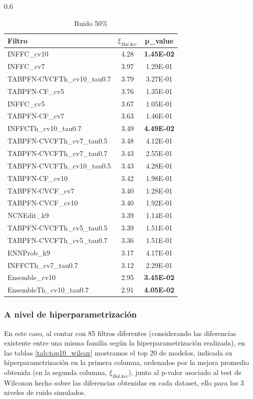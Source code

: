 \documentclass[print, color]{ugrTFG}
\begin{document}
\begin{table}[h!]
\begin{subtable}{0.6\textwidth}
\centering
\caption{Ruido 50\%}
\begin{tabular}{lcc}
\toprule
Filtro & $\xi_{BalAcc}$ & p\_value \\
\midrule
INFFC\_cv10 & 4.28 & \textbf{1.45E-02} \\
INFFC\_cv7 & 3.97 & 1.29E-01 \\
TABPFN-CVCFTh\_cv10\_tau0.7 & 3.79 & 3.27E-01 \\
TABPFN-CF\_cv5 & 3.76 & 1.35E-01 \\
INFFC\_cv5 & 3.67 & 1.05E-01 \\
TABPFN-CF\_cv7 & 3.63 & 1.46E-01 \\
INFFCTh\_cv10\_tau0.7 & 3.49 & \textbf{4.49E-02} \\
TABPFN-CVCFTh\_cv7\_tau0.5 & 3.48 & 4.12E-01 \\
TABPFN-CVCFTh\_cv7\_tau0.7 & 3.43 & 2.55E-01 \\
TABPFN-CVCFTh\_cv10\_tau0.5 & 3.43 & 4.28E-01 \\
TABPFN-CF\_cv10 & 3.42 & 1.98E-01 \\
TABPFN-CVCF\_cv7 & 3.40 & 1.28E-01 \\
TABPFN-CVCF\_cv10 & 3.40 & 1.92E-01 \\
NCNEdit\_k9 & 3.39 & 1.14E-01 \\
TABPFN-CVCFTh\_cv5\_tau0.5 & 3.39 & 1.51E-01 \\
TABPFN-CVCFTh\_cv5\_tau0.7 & 3.36 & 1.51E-01 \\
ENNProb\_k9 & 3.17 & 4.17E-01 \\
INFFCTh\_cv7\_tau0.7 & 3.12 & 2.29E-01 \\
Ensemble\_cv10 & 2.95 & \textbf{3.45E-02} \\
EnsembleTh\_cv10\_tau0.7 & 2.91 & \textbf{4.05E-02} \\
\bottomrule
\end{tabular}

\end{subtable}

\end{table}


 \subsubsection{A nivel de hiperparametrización}\label{sect:resultadosPromedio_porFamilia}
 En este caso, al contar con 85 filtros diferentes (considerando las diferencias existente entre una misma familia según la hiperparametrización realizada), en las tablas \ref{tab:top10_wilcox} mostramos el top 20 de modelos, indicada su hiperparametrización en la primera columna, ordenados por la mejora promedio obtenida (en la segunda columna, $\xi_{BalAcc}$), junto al p-valor asociado al test de Wilcoxon hecho sobre las diferencias obtenidas en cada dataset, ello para los 3 niveles de ruido simulados. 
    
\end{document}
